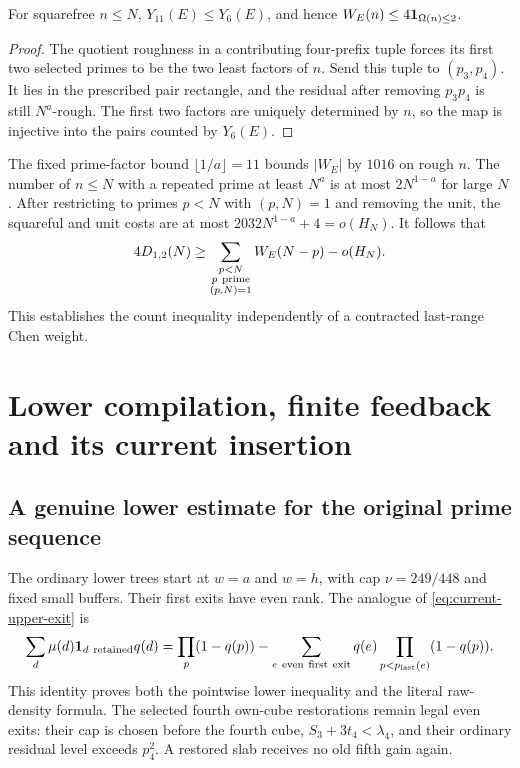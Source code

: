 \begin{lemma}
\label{lem:current-paired-injection}
For squarefree $n\le N$, $Y_{11}(E)\le Y_6(E)$, and hence
$W_E(n)\le4{\bf1}_{\Omega(n)\le2}$.
\end{lemma}

\begin{proof}
The quotient roughness in a contributing four-prefix tuple forces
its first two selected primes to be the two least factors of $n$.
Send this tuple to $(p_3,p_4)$.  It lies in the prescribed pair
rectangle, and the residual after removing $p_3p_4$ is still
$N^a$-rough.  The first two factors are uniquely determined by $n$,
so the map is injective into the pairs counted by $Y_6(E)$.
\end{proof}

The fixed prime-factor bound $\lfloor1/a\rfloor=11$ bounds
$|W_E|$ by $1016$ on rough $n$.  The number of $n\le N$ with a
repeated prime at least $N^a$ is at most $2N^{1-a}$ for large $N$.
After restricting to primes $p<N$ with $(p,N)=1$ and removing the
unit, the squareful and unit costs are at most
$2032N^{1-a}+4=o(H_N)$.  It follows that
\begin{equation}
 4D_{1,2}(N)\ge
       \sum_{\substack{p<N\\p\ {\rm prime}\\(p,N)=1}}W_E(N-p)
        -o(H_N).
 \label{eq:current-weight-to-count}
\end{equation}
This establishes the count inequality independently of a contracted
last-range Chen weight.

\section{Lower compilation, finite feedback and its current insertion}
\label{sec:current-lower}

\subsection{A genuine lower estimate for the original prime sequence}

The ordinary lower trees start at $w=a$ and $w=h$, with cap
$\nu=249/448$ and fixed small buffers.  Their first exits have even
rank.  The analogue of \eqref{eq:current-upper-exit} is
\begin{equation}
 \sum_d\mu(d){\bf1}_{d\ {\rm retained}}q(d)
 =\prod_p(1-q(p))
  -\sum_{e\ {\rm even\ first\ exit}}q(e)
                       \prod_{p<p_{\rm last}(e)}(1-q(p)).
 \label{eq:current-lower-exit}
\end{equation}
This identity proves both the pointwise lower inequality and the
literal raw-density formula.  The selected fourth own-cube
restorations remain legal even exits: their cap is chosen before
the fourth cube, $S_3+3t_4<\lambda_4$, and their ordinary residual
level exceeds $p_4^2$.  A restored slab receives no old fifth gain
again.

